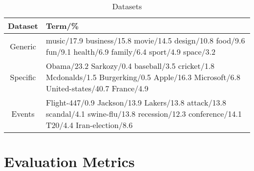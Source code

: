 \documentclass{sig-alternate}
\newcommand{\secmoveup}{\vspace{-1.mm}}
\begin{document}
\begin{table}%
\centering
\caption{Datasets}\label{tbl-q}
\resizebox{8.5cm}{!} 
{
	\begin{tabular}{|c|p{4in}|}
	\hline
        Dataset & Term/\% \\
\hline
Generic &{\small music/17.9 business/15.8 movie/14.5 design/10.8
       food/9.6 fun/9.1 health/6.9 family/6.4 sport/4.9 space/3.2}  \\
Specific &{\small 
Obama/23.2 Sarkozy/0.4 baseball/3.5 cricket/1.8 Mcdonalds/1.5 Burgerking/0.5 Apple/16.3 Microsoft/6.8 United-states/40.7 France/4.9} \\
Events &{\small Flight-447/0.9 Jackson/13.9  Lakers/13.8 attack/13.8 scandal/4.1 swine-flu/13.8 recession/12.3 conference/14.1 T20/4.4 Iran-election/8.6  }\\
	\hline
	\end{tabular}
}\vspace*{-10pt}
\end{table}
 

\secmoveup
\section{Evaluation Metrics}

\label{sec:evaluation}

\end{document}
